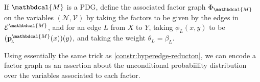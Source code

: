 \documentclass[letterpaper]{article} %
\theoremstyle{plain}
\theoremstyle{definition}
\theoremstyle{remark}
\newcommand\mat[1]{\mathbf{#1}}
\newcommand{\bp}[1][L]{\mat{p}_{\!_{#1}\!}}
\newcommand{\V}{\mathcal V}
\newcommand{\N}{\mathcal N}
\newcommand{\Ed}{\mathcal E}
\newcommand{\pdgvars}[1][]{(\N#1, \Ed#1, \V#1, \mat p#1, \beta#1)}
\newcommand{\dg}[1]{\mathbdcal{#1}}
\newcommand{\ed}[3]{#2
  \overset{\smash{\mskip-5mu\raisebox{-1pt}{$\scriptscriptstyle
        #1$}}}{\rightarrow} #3}
\begin{document}
\begin{defn}\label{def:PDG2fg}
  If $\dg M$ is a PDG, define   
the associated factor graph $\Phi_{\dg M}$ on the	
variables $(\N,\V)$ by
taking the factors to be given by the edges in $\Ed^{\dg M}$, and for an
edge $L$ from $X$ to $Y$, taking $\phi_L(x,y)$ to be $(\bp^{\dg
  M}(x))(y)$, and taking the weight $\theta_L = \beta_L$.
\end{defn}
Using essentially the same trick as \cref{constr:hyperedge-reducton}, we can encode a factor graph as an assertion about the unconditional probabiility distribution over the variables associated to each factor. 
\end{document}
